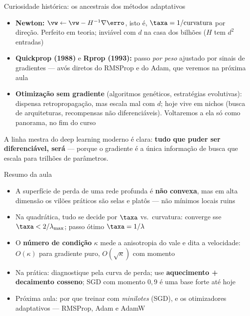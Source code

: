 \documentclass[aspectratio=169, 11pt]{beamer}
\begin{document}
\begin{frame}{Curiosidade histórica: os ancestrais dos métodos adaptativos}
  \begin{itemize}\setlength{\itemsep}{0.4ex}
    \item \textbf{Newton:} \(\vw \leftarrow \vw - H^{-1}\nabla\erro\), isto é,
          \(\taxa = 1/\text{curvatura}\) por direção. Perfeito em teoria;
          inviável com \(d\) na casa dos bilhões (\(H\) tem \(d^2\) entradas)
    \item \textbf{Quickprop (1988)} e \textbf{Rprop (1993):} passo \emph{por
          peso} ajustado por sinais de gradientes — avós diretos do RMSProp e
          do Adam, que veremos na próxima aula
    \item \textbf{Otimização sem gradiente} (algoritmos genéticos, estratégias
          evolutivas): dispensa retropropagação, mas escala mal com \(d\); hoje
          vive em nichos (busca de arquiteturas, recompensas não diferenciáveis).
          Voltaremos a ela só como panorama, no fim do curso
  \end{itemize}

  \begin{ideiabox}
    A linha mestra do deep learning moderno é clara: \textbf{tudo que puder ser
    diferenciável, será} — porque o gradiente é a única informação de busca que
    escala para trilhões de parâmetros.
  \end{ideiabox}
\end{frame}

\begin{frame}{Resumo da aula}
  \begin{itemize}\setlength{\itemsep}{0.4ex}
    \item A superfície de perda de uma rede profunda é \textbf{não convexa}, mas
          em alta dimensão os vilões práticos são selas e platôs — não mínimos
          locais ruins
    \item Na quadrática, tudo se decide por \(\taxa\) vs.\ curvatura:
          converge sse \(\taxa < 2/\lambda_{\max}\); passo ótimo
          \(\taxa = 1/\lambda\)
    \item O \textbf{número de condição} \(\kappa\) mede a anisotropia do vale e
          dita a velocidade: \(O(\kappa)\) para gradiente puro,
          \(O(\sqrt{\kappa})\) com momento
    \item Na prática: diagnostique pela curva de perda; use
          \textbf{aquecimento + decaimento cosseno}; SGD com momento
          \(0{,}9\) é uma base forte até hoje
    \item Próxima aula: por que treinar com \emph{minilotes} (SGD), e os
          otimizadores adaptativos — RMSProp, Adam e AdamW
  \end{itemize}
\end{frame}
\end{document}
